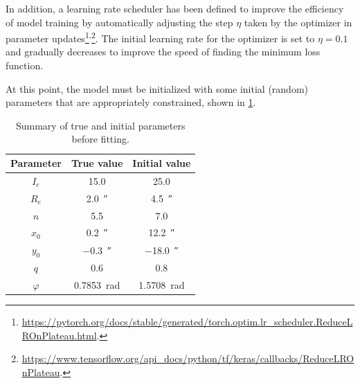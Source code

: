 In addition, a learning rate scheduler has been defined to improve the efficiency of model training by automatically adjusting the step $\eta$ taken by the optimizer in parameter updates\footnote{\url{https://pytorch.org/docs/stable/generated/torch.optim.lr_scheduler.ReduceLROnPlateau.html}.}\textsuperscript{,}\footnote{\url{https://www.tensorflow.org/api_docs/python/tf/keras/callbacks/ReduceLROnPlateau}.}. The initial learning rate for the optimizer is set to $\eta = 0.1$ and gradually decreases to improve the speed of finding the minimum loss function.

At this point, the model must be initialized with some initial (random) parameters that are appropriately constrained, shown in \cref{tab:parameters_1}.

\begin{table}[]
\setlength{\extrarowheight}{2pt}
\setlength{\tabcolsep}{1pt}
\centering
\caption{Summary of true and initial parameters before fitting.}
\label{tab:parameters_1}
\begin{tabular}{@{}c@{\hskip 20pt}c@{}@{\hskip 20pt}c@{}}
\toprule
Parameter           & True value                 &  Initial value            \\ \midrule
$I_e$               & \SI{15.0}{}                &  \SI{25.0}{}              \\
$R_e$               & \SI{2.0}{\arcsecond}       &  \SI{4.5}{\arcsecond}     \\
$n$                 & \SI{5.5}{}                 &  \SI{7.0}{}               \\
$x_0$               & \SI{0.2}{\arcsecond}       &  \SI{12.2}{\arcsecond}     \\
$y_0$               & \SI{-0.3}{\arcsecond}      &  \SI{-18.0}{\arcsecond}    \\
$q$                 & \SI{0.6}{}                 &  \SI{0.8}{}               \\
$\varphi$           & \SI{0.7853}{\radian}       &  \SI{1.5708}{\radian}     \\ \bottomrule
\end{tabular}
\end{table}

